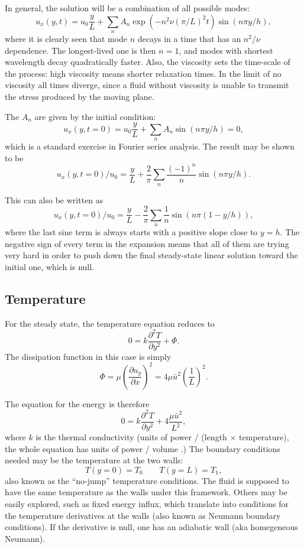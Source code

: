 In general, the solution will be a combination of all possible modes:
\[
u_x(y,t) =  u_0 \frac{y}{L}
+ \sum_n A_n
\exp(-  n^2 \nu (\pi/L)^2   t)  \sin(n\pi y/h),
\]
where it is clearly seen that mode $n$ decays in a time that has an
$n^2 /\nu $ dependence. The longest-lived one is then $n=1$, and modes
with shortest wavelength decay quadratically faster. Also, the
viscosity sets the time-scale of the process: high viscosity means
shorter relaxation times. In the limit of no viscosity all times
diverge, since a fluid without viscosity is unable to transmit the
stress produced by the moving plane.

The $A_n$ are given by the initial condition:
\[
u_x(y,t=0) =  
u_0 \frac{y}{L}
+ \sum_n A_n \sin(n\pi y/h) = 0 ,
\]
which is a standard exercise in Fourier series analysis. The result
may be shown to be
\[
u_x(y,t=0) / u_0  =  
 \frac{y}{L}
+\frac{2}{\pi}
 \sum_n \frac{(-1)^n}{n} \sin(n\pi y/h)  .
\]

This can also be written as 
\[
u_x(y,t=0) / u_0  =  
 \frac{y}{L}
-\frac{2}{\pi}
 \sum_n \frac{1}{n} \sin(n\pi (1-y/h))  ,
\]
where the last sine term is always starts with a positive slope close to $y=h$.
The negative sign of every term in the expansion means that all of them are
trying very hard in order to push down the final steady-state linear solution
toward the initial one, which is null.



\subsection{Temperature}


For the steady state, the temperature equation reduces to
\[
0 = k  \frac{\partial^2 T}{\partial y^2} + \Phi  .
\]
The dissipation function in this case is simply
\[
\Phi =   \mu  \left( \frac{\partial u_y}{\partial x} \right)^2 =
4 \mu \bar{u}^2  \left(\frac{1}{L}  \right)^2 .
\]

The equation for the energy is therefore
\[
0 = k \frac{\partial^2 T}{\partial y^2} +
4  \frac{ \mu \bar{u}^2  }{L^2} ,
\]
where $k$ is the thermal conductivity (units of power / (length
$\times$ temperature), the whole equation has units of power / volume
.) The boundary conditions needed may be the temperature at the two
walls:
\[
T(y=0) = T_0 \qquad
T(y=L) = T_1 ,
\]
also known as the ``no-jump'' temperature conditions. The fluid is
supposed to have the same temperature as the walls under this
framework. Others may be easily explored, such as fixed energy influx,
which translate into conditions for the temperature derivatives at the
walls (also known as Neumann boundary conditions). If the derivative
is null, one has an adiabatic wall (aka homegeneous Neumann).

